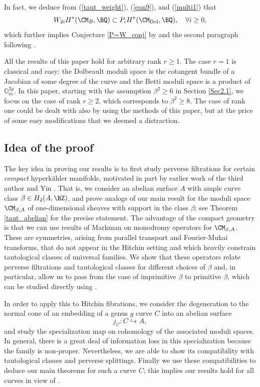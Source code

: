 In fact, we deduce from (\ref{taut_weight}), (\ref{eqn9}), and (\ref{multi1}) that
\[
W_{2i}H^*(\CM_B, \BQ) \subset P_iH^*(\CM_{\mathrm{Dol}}, \BQ), \quad \forall i\geq 0,
\]
which further implies Conjecture \ref{P=W_conj} by \cite[Theorem 1.5.3]{Mellit}
and the second paragraph following \cite[Corollary 1.5.4]{Mellit}.


{
\begin{rmk}
\notready\label{r=1}
All the results of this paper hold for arbitrary rank $r \geq 1$. The case $r=1$ is classical and easy: the Dolbeault moduli space is the cotangent bundle of a Jacobian of some degree  of the curve and the Betti moduli space
is a product of $\mathbb G_m^{2g}$. In this paper, starting with the assumption {$\beta^2\geq 6$} in Section \ref{Sec2.1}, we focus on the case of rank $r\geq 2$, {which corresponds to $\beta^2 \geq 8$}. The case of rank one could be dealt with also by using the methods of this paper, but at the price of some easy modifications that we deemed a distraction.
\end{rmk}
}
\subsection{Idea of the proof}

The key idea in proving our results
is to first study perverse filtrations for certain \emph{compact} hyperk\"ahler manifolds, motivated in part by earlier work of the third author and Yin \cite{SY}.
That is, we consider an abelian surface $A$ with ample curve class $\beta \in H_2(A, \BZ)$, and prove analogs of
our main result for the moduli space
$\CM_{\beta,A}$ of one-dimensional sheaves with support in the class $\beta$; see Theorem \ref{taut_abelian} for the precise statement.
The advantage of the compact geometry is that we can use
results of Markman \cite{Markman3} on monodromy operators for $\CM_{\beta,A}$.  These are symmetries, arising from parallel transport and Fourier-Mukai transforms, that do not appear in the Hitchin setting and which heavily constrain tautological classes of universal families. We show that these operators relate perverse filtrations and tautological classes for different choices of $\beta$ and, in particular, allow us to pass from the case of imprimitive $\beta$ to primitive $\beta$, which can be studied directly using \cite{Z,SZ}.

In order to apply this to Hitchin fibrations, we consider the degeneration to the normal cone of an embedding
of {a genus $g$ curve $C$} into an abelian surface
\[
j_C: C\hookrightarrow A,
\]
and study the specialization map on cohomology of the associated moduli spaces.  In general, there is a great deal of information loss in this specialization because the family is non-proper. Nevertheless, we are able to show its compatibility with tautological classes and perverse splittings.  Finally we use these compatibilities  to deduce our main theorems {for such a curve $C$; this implies our results hold  for all curves in view of \cite{dCM}.}

